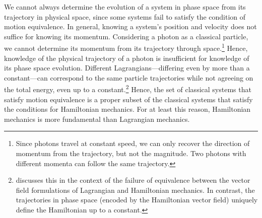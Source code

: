 \documentclass[letterpaper]{article}
\begin{document}
We cannot always determine the evolution of a system in phase space from its trajectory in physical space, since some systems fail to satisfy the condition of motion equivalence. In general, knowing a system's position and velocity does not suffice for knowing its momentum. Considering a photon as a classical particle, we cannot determine its momentum from its trajectory through space.\footnote{Since photons travel at constant speed, we can only recover the direction of momentum from the trajectory, but not the magnitude. Two photons with different momenta can follow the same trajectory.} Hence, knowledge of the physical trajectory of a photon is insufficient for knowledge of its phase space evolution. Different Lagrangians---differing even by more than a constant---can correspond to the same particle trajectories while not agreeing on the total energy, even up to a constant.\footnote{\textcites[1185--1186]{Barrett2} discusses this in the context of the failure of equivalence between the vector field formulations of Lagrangian and Hamiltonian mechanics. In contrast, the trajectories in phase space (encoded by the Hamiltonian vector field) uniquely define the Hamiltonian up to a constant.} Hence, the set of classical systems that satisfy motion equivalence is a proper subset of the classical systems that satisfy the conditions for Hamiltonian mechanics. For at least this reason, Hamiltonian mechanics is more fundamental than Lagrangian mechanics.
\end{document}
